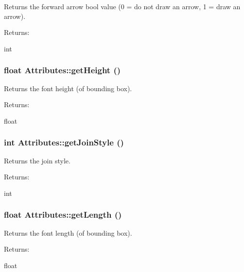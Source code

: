 Returns the forward arrow bool value (0 = do not draw an arrow, 1 = draw an arrow). \begin{Desc}
\item[Returns: ]\par
int \end{Desc}
\subsubsection{\setlength{\rightskip}{0pt plus 5cm}float Attributes::get\-Height ()\hspace{0.3cm}{\tt  [inline]}}\label{classAttributes_a43}


Returns the font height (of bounding box). \begin{Desc}
\item[Returns: ]\par
float \end{Desc}
\subsubsection{\setlength{\rightskip}{0pt plus 5cm}int Attributes::get\-Join\-Style ()\hspace{0.3cm}{\tt  [inline]}}\label{classAttributes_a32}


Returns the join style. \begin{Desc}
\item[Returns: ]\par
int \end{Desc}
\subsubsection{\setlength{\rightskip}{0pt plus 5cm}float Attributes::get\-Length ()\hspace{0.3cm}{\tt  [inline]}}\label{classAttributes_a44}


Returns the font length (of bounding box). \begin{Desc}
\item[Returns: ]\par
float \end{Desc}
